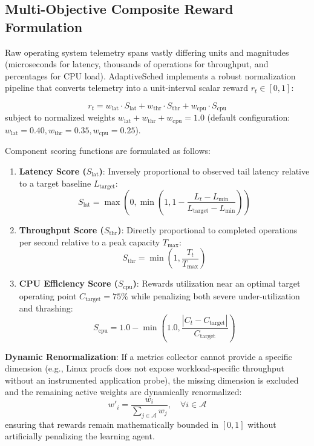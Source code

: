 \documentclass[journal]{IEEEtran}
\begin{document}
\subsection{Multi-Objective Composite Reward Formulation}
Raw operating system telemetry spans vastly differing units and magnitudes (microseconds for latency, thousands of operations for throughput, and percentages for CPU load). AdaptiveSched implements a robust normalization pipeline that converts telemetry into a unit-interval scalar reward $r_t \in [0, 1]$:

\begin{equation}
r_t = w_{\text{lat}} \cdot S_{\text{lat}} + w_{\text{thr}} \cdot S_{\text{thr}} + w_{\text{cpu}} \cdot S_{\text{cpu}}
\end{equation}
subject to normalized weights $w_{\text{lat}} + w_{\text{thr}} + w_{\text{cpu}} = 1.0$ (default configuration: $w_{\text{lat}} = 0.40, w_{\text{thr}} = 0.35, w_{\text{cpu}} = 0.25$).

Component scoring functions are formulated as follows:
\begin{enumerate}
    \item \textbf{Latency Score ($S_{\text{lat}}$)}: Inversely proportional to observed tail latency relative to a target baseline $L_{\text{target}}$:
    \begin{equation}
    S_{\text{lat}} = \max\left(0, \min\left(1, 1 - \frac{L_t - L_{\text{min}}}{L_{\text{target}} - L_{\text{min}}}\right)\right)
    \end{equation}
    \item \textbf{Throughput Score ($S_{\text{thr}}$)}: Directly proportional to completed operations per second relative to a peak capacity $T_{\text{max}}$:
    \begin{equation}
    S_{\text{thr}} = \min\left(1, \frac{T_t}{T_{\text{max}}}\right)
    \end{equation}
    \item \textbf{CPU Efficiency Score ($S_{\text{cpu}}$)}: Rewards utilization near an optimal target operating point $C_{\text{target}} = 75\%$ while penalizing both severe under-utilization and thrashing:
    \begin{equation}
    S_{\text{cpu}} = 1.0 - \min\left(1.0, \frac{|C_t - C_{\text{target}}|}{C_{\text{target}}}\right)
    \end{equation}
\end{enumerate}

\textbf{Dynamic Renormalization}: If a metrics collector cannot provide a specific dimension (e.g., Linux procfs does not expose workload-specific throughput without an instrumented application probe), the missing dimension is excluded and the remaining active weights are dynamically renormalized:
\begin{equation}
w'_i = \frac{w_i}{\sum_{j \in \mathcal{A}} w_j}, \quad \forall i \in \mathcal{A}
\end{equation}
ensuring that rewards remain mathematically bounded in $[0, 1]$ without artificially penalizing the learning agent.
\end{document}
